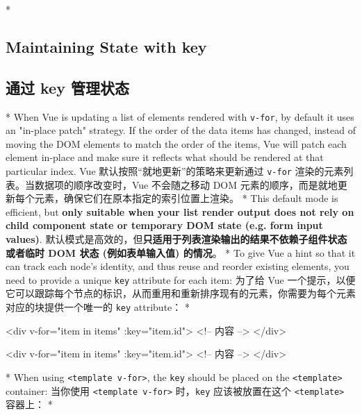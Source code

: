 \begin{paracol}{2}

\switchcolumn[0]*%
\subsection{Maintaining State with key}
\switchcolumn
\subsection{通过 key 管理状态}
\switchcolumn[0]*%
When Vue is updating a list of elements rendered with \texttt{v-for}, by
default it uses an "in-place patch" strategy. If the order of the data
items has changed, instead of moving the DOM elements to match the order
of the items, Vue will patch each element in-place and make sure it
reflects what should be rendered at that particular index.
\switchcolumn
Vue 默认按照``就地更新''的策略来更新通过 \texttt{v-for}
渲染的元素列表。当数据项的顺序改变时，Vue 不会随之移动 DOM
元素的顺序，而是就地更新每个元素，确保它们在原本指定的索引位置上渲染。
\switchcolumn[0]*%
This default mode is efficient, but \textbf{only suitable when your list
render output does not rely on child component state or temporary DOM
state (e.g. form input values)}.
\switchcolumn
默认模式是高效的，但\textbf{只适用于列表渲染输出的结果不依赖子组件状态或者临时
DOM 状态 (例如表单输入值) 的情况}。
\switchcolumn[0]*%
To give Vue a hint so that it can track each node's identity, and thus
reuse and reorder existing elements, you need to provide a unique
\texttt{key} attribute for each item:
\switchcolumn
为了给 Vue
一个提示，以便它可以跟踪每个节点的标识，从而重用和重新排序现有的元素，你需要为每个元素对应的块提供一个唯一的
\texttt{key} attribute：
\switchcolumn[0]*%
\begin{codeHtml}
<div v-for="item in items" :key="item.id">
    <!-- 内容 -->
</div>
\end{codeHtml}
\switchcolumn
\begin{codeHtml}
<div v-for="item in items" :key="item.id">
    <!-- 内容 -->
</div>
\end{codeHtml}
\switchcolumn[0]*%
When using \texttt{\textless{}template\ v-for\textgreater{}}, the
\texttt{key} should be placed on the
\texttt{\textless{}template\textgreater{}} container:
\switchcolumn
当你使用 \texttt{\textless{}template\ v-for\textgreater{}}
时，\texttt{key} 应该被放置在这个
\texttt{\textless{}template\textgreater{}} 容器上：
\switchcolumn[0]*%
\begin{codeHtml}

\end{codeHtml}
\end{paracol}
